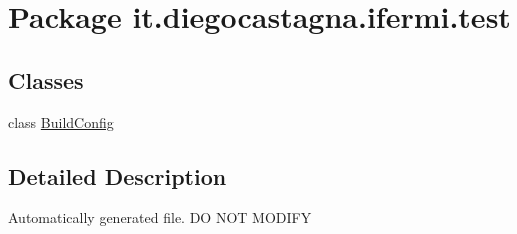 \hypertarget{namespaceit_1_1diegocastagna_1_1ifermi_1_1test}{}\section{Package it.\+diegocastagna.\+ifermi.\+test}
\label{namespaceit_1_1diegocastagna_1_1ifermi_1_1test}
\subsection*{Classes}
\begin{DoxyCompactItemize}
\item 
class \mbox{\hyperlink{classit_1_1diegocastagna_1_1ifermi_1_1test_1_1_build_config}{Build\+Config}}
\end{DoxyCompactItemize}


\subsection{Detailed Description}
Automatically generated file. DO N\+OT M\+O\+D\+I\+FY 